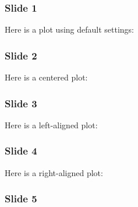 \documentclass[t]{beamer}
\begin{document}
\begin{frame}[fragile]
\frametitle{Slide 1}


Here is a plot using default settings:

\noindent{}

\end{frame}

\begin{frame}[fragile]
\frametitle{Slide 2}


Here is a centered plot:

\noindent{}

\end{frame}

\begin{frame}[fragile]
\frametitle{Slide 3}


Here is a left-aligned plot:


\end{frame}

\begin{frame}[fragile]
\frametitle{Slide 4}


Here is a right-aligned plot:


\end{frame}

\begin{frame}[fragile]
\frametitle{Slide 5}


\noindent{}

\end{frame}
\end{document}
